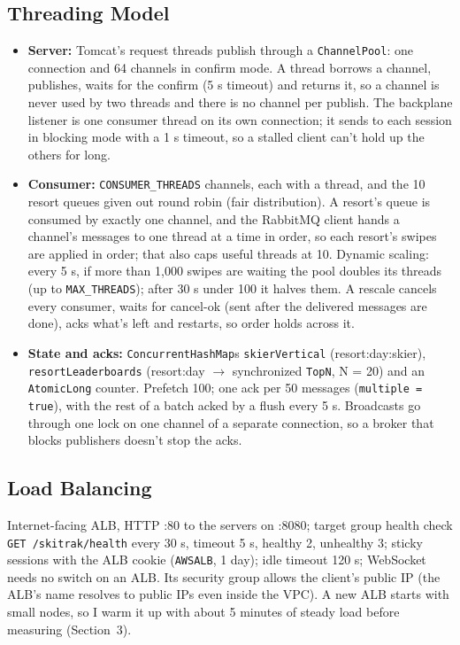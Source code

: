 \documentclass[10pt]{article}
\begin{document}
\subsection{Threading Model}
\begin{itemize}
  \item \textbf{Server:} Tomcat's request threads publish through a \texttt{ChannelPool}: one connection and 64 channels in confirm mode. A thread borrows a channel, publishes, waits for the confirm (5 s timeout) and returns it, so a channel is never used by two threads and there is no channel per publish. The backplane listener is one consumer thread on its own connection; it sends to each session in blocking mode with a 1 s timeout, so a stalled client can't hold up the others for long.
  \item \textbf{Consumer:} \texttt{CONSUMER\_THREADS} channels, each with a thread, and the 10 resort queues given out round robin (fair distribution). A resort's queue is consumed by exactly one channel, and the RabbitMQ client hands a channel's messages to one thread at a time in order, so each resort's swipes are applied in order; that also caps useful threads at 10. Dynamic scaling: every 5 s, if more than 1,000 swipes are waiting the pool doubles its threads (up to \texttt{MAX\_THREADS}); after 30 s under 100 it halves them. A rescale cancels every consumer, waits for cancel-ok (sent after the delivered messages are done), acks what's left and restarts, so order holds across it.
  \item \textbf{State and acks:} \texttt{ConcurrentHashMap}s \texttt{skierVertical} (resort:day:skier), \texttt{resortLeaderboards} (resort:day $\to$ synchronized \texttt{TopN}, N = 20) and an \texttt{AtomicLong} counter. Prefetch 100; one ack per 50 messages (\texttt{multiple = true}), with the rest of a batch acked by a flush every 5 s. Broadcasts go through one lock on one channel of a separate connection, so a broker that blocks publishers doesn't stop the acks.
\end{itemize}

\subsection{Load Balancing}
Internet-facing ALB, HTTP :80 to the servers on :8080; target group health check \texttt{GET /skitrak/health} every 30 s, timeout 5 s, healthy 2, unhealthy 3; sticky sessions with the ALB cookie (\texttt{AWSALB}, 1 day); idle timeout 120 s; WebSocket needs no switch on an ALB. Its security group allows the client's public IP (the ALB's name resolves to public IPs even inside the VPC). A new ALB starts with small nodes, so I warm it up with about 5 minutes of steady load before measuring (Section~3).
\end{document}
